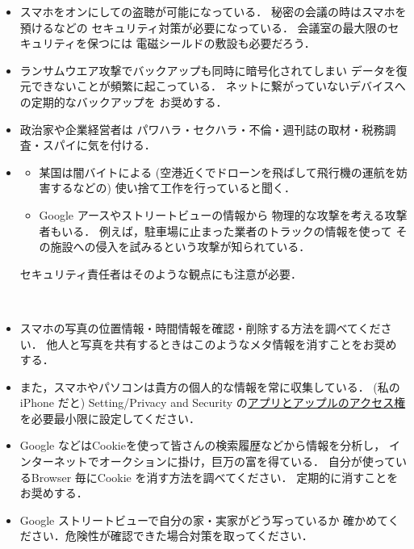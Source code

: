 \begin{itemize}
   \item
      スマホをオンにしての盗聴が可能になっている．
      秘密の会議の時はスマホを預けるなどの
      セキュリティ対策が必要になっている．
      会議室の最大限のセキュリティを保つには
      電磁シールドの敷設も必要だろう．

   \item 
      ランサムウエア攻撃でバックアップも同時に暗号化されてしまい
      データを復元できないことが頻繁に起こっている．
      ネットに繋がっていないデバイスへの定期的なバックアップを
      お奨めする．
      
   \item
      政治家や企業経営者は
      パワハラ・セクハラ・不倫・週刊誌の取材・税務調査・スパイに気を付ける．
      
   \item
       \begin{itemize}
         \item 
            某国は闇バイトによる
            (空港近くでドローンを飛ばして飛行機の運航を妨害するなどの)
            使い捨て工作を行っていると聞く．
         \item 
            Google アースやストリートビューの情報から
            物理的な攻撃を考える攻撃者もいる．
            例えば，駐車場に止まった業者のトラックの情報を使って
            その施設への侵入を試みるという攻撃が知られている．
            
       \end{itemize}
   セキュリティ責任者はそのような観点にも注意が必要．

\end{itemize}

\begin{Q}　
   \begin{itemize}
      \item 
         スマホの写真の位置情報・時間情報を確認・削除する方法を調べてください．
         他人と写真を共有するときはこのようなメタ情報を消すことをお奨めする．
   
      \item 
         また，スマホやパソコンは貴方の個人的な情報を常に収集している．
         (私のiPhone だと)
         Setting/Privacy and Security の\href{https://www.youtube.com/watch?v=XtOD7Cqd_H0}{アプリとアップルのアクセス権}を必要最小限に設定してください．
   
      \item    
         Google などはCookieを使って皆さんの検索履歴などから情報を分析し，
         インターネットでオークションに掛け，巨万の富を得ている．
         自分が使っているBrowser 毎にCookie を消す方法を調べてください．
         定期的に消すことをお奨めする．
      \item    
         Google ストリートビューで自分の家・実家がどう写っているか
         確かめてください．危険性が確認できた場合対策を取ってください．
   \end{itemize}
\end{Q}

